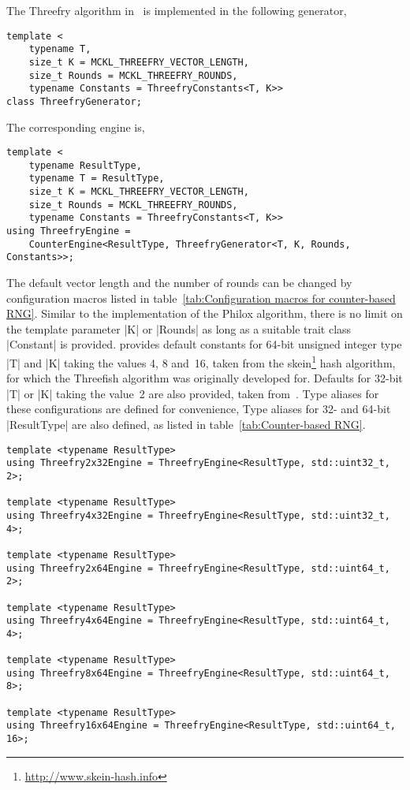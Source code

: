 The Threefry algorithm in~\cite{Salmon:2011um} is implemented in the following
generator,
\begin{Verbatim}
template <
    typename T,
    size_t K = MCKL_THREEFRY_VECTOR_LENGTH,
    size_t Rounds = MCKL_THREEFRY_ROUNDS,
    typename Constants = ThreefryConstants<T, K>>
class ThreefryGenerator;
\end{Verbatim}
The corresponding \rng engine is,
\begin{Verbatim}
template <
    typename ResultType,
    typename T = ResultType,
    size_t K = MCKL_THREEFRY_VECTOR_LENGTH,
    size_t Rounds = MCKL_THREEFRY_ROUNDS,
    typename Constants = ThreefryConstants<T, K>>
using ThreefryEngine =
    CounterEngine<ResultType, ThreefryGenerator<T, K, Rounds, Constants>>;
\end{Verbatim}
The default vector length and the number of rounds can be changed by
configuration macros listed in table~\ref{tab:Configuration macros for
counter-based RNG}. Similar to the implementation of the Philox algorithm,
there is no limit on the template parameter |K| or |Rounds| as long as a
suitable trait class |Constant| is provided. \mckl provides default constants
for 64-bit unsigned integer type |T| and |K| taking the values 4, 8 and~16,
taken from the skein\footnote{\url{http://www.skein-hash.info}} hash algorithm,
for which the Threefish algorithm was originally developed for. Defaults for
32-bit |T| or |K| taking the value~2 are also provided, taken
from~\cite{Salmon:2011um}. Type aliases for these configurations are defined
for convenience, Type aliases for 32- and 64-bit |ResultType| are also defined,
as listed in table~\ref{tab:Counter-based RNG}.
\begin{Verbatim}
template <typename ResultType>
using Threefry2x32Engine = ThreefryEngine<ResultType, std::uint32_t, 2>;

template <typename ResultType>
using Threefry4x32Engine = ThreefryEngine<ResultType, std::uint32_t, 4>;

template <typename ResultType>
using Threefry2x64Engine = ThreefryEngine<ResultType, std::uint64_t, 2>;

template <typename ResultType>
using Threefry4x64Engine = ThreefryEngine<ResultType, std::uint64_t, 4>;

template <typename ResultType>
using Threefry8x64Engine = ThreefryEngine<ResultType, std::uint64_t, 8>;

template <typename ResultType>
using Threefry16x64Engine = ThreefryEngine<ResultType, std::uint64_t, 16>;
\end{Verbatim}

